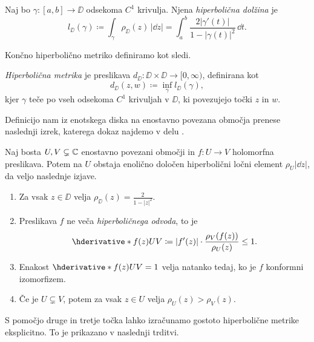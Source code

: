 \begin{definicija}
    Naj bo \(\gamma \colon [a, b] \to \DD\) odsekoma \(C^1\) krivulja. Njena \emph{hiperbolična dolžina} je
    \[l_{\DD} (\gamma) \coloneq \int_{\gamma} \rho_{\DD} (z) \, | \dd z | = \int_{a}^{b} \frac{2 | \gamma' (t) | }{1 - | \gamma (t) |^2} \, \dd t.\]
\end{definicija}

\noindent Končno hiperbolično metriko definiramo kot sledi.

\begin{definicija}
    \emph{Hiperbolična metrika} je preslikava \(d_{\DD} \colon \DD \times \DD \to [0, \infty)\), definirana kot
    \[d_{\DD} (z, w) \coloneq \inf_{\gamma} l_{\DD} (\gamma),\]
    kjer \(\gamma\) teče po vseh odsekoma \(C^1\) krivuljah v \(\DD\), ki povezujejo točki \(z\) in \(w\).
\end{definicija}

Definicijo nam iz enotskega diska na enostavno povezana območja prenese naslednji izrek, katerega dokaz najdemo v delu \cite[izrek 6.4]{Beardon_2006}.

\begin{izrek}[Pick] \label{thm:pick}
    Naj bosta \(U, V \subsetneq \mathbb C\) enostavno povezani območji in \(f \colon U \to V\) holomorfna preslikava. Potem na \(U\) obstaja enolično določen hiperbolični ločni element \(\rho_U |\dd z|\), da veljo naslednje izjave.
    \begin{enumerate}
        \item Za vsak \(z \in \DD\) velja \(\rho_{\DD} (z) = \frac{2}{1 - |z|^2}\).
        \item Preslikava \(f\) ne veča \emph{hiperboličnega odvoda}, to je \[\hder{f (z)}{U}{V} \coloneq |f' (z)| \cdot \frac{\rho_V (f (z))}{\rho_U (z)} \leq 1.\]
        \item Enakost \(\hder{f (z)}{U}{V} = 1\) velja natanko tedaj, ko je \(f\) konformni izomorfizem.
        \item Če je \(U \subsetneq V\), potem za vsak \(z \in U\) velja \(\rho_U (z) > \rho_V (z)\).
    \end{enumerate}
\end{izrek}

\noindent S pomočjo druge in tretje točka lahko izračunamo gostoto hiperbolične metrike eksplicitno. To je prikazano v naslednji trditvi.


